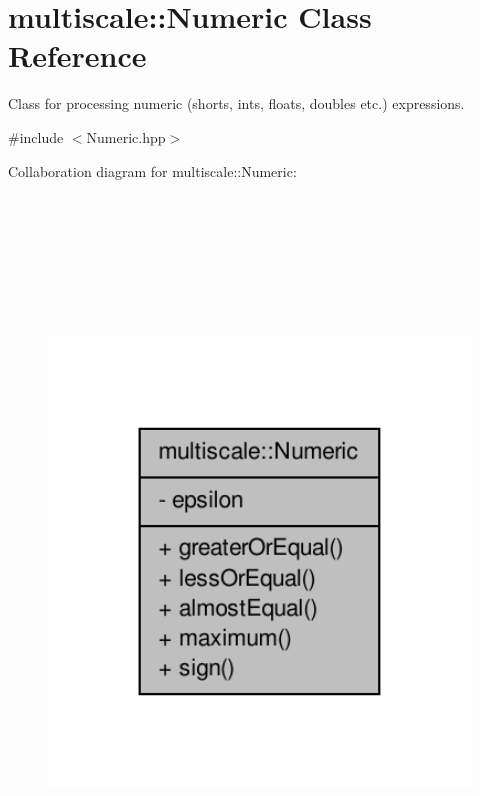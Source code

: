 \hypertarget{classmultiscale_1_1Numeric}{\section{multiscale\-:\-:\-Numeric \-Class \-Reference}
\label{classmultiscale_1_1Numeric}
}


\-Class for processing numeric (shorts, ints, floats, doubles etc.) expressions.  




{\ttfamily \#include $<$\-Numeric.\-hpp$>$}



\-Collaboration diagram for multiscale\-:\-:\-Numeric\-:
\nopagebreak
\begin{figure}[H]
\begin{center}
\leavevmode
\includegraphics[height=550pt]{classmultiscale_1_1Numeric__coll__graph}
\end{center}
\end{figure}
